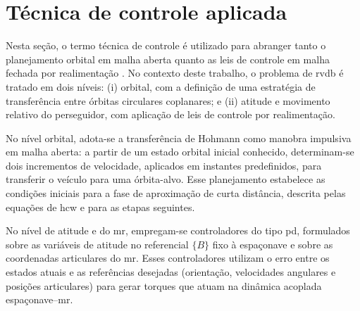 \section{Técnica de controle aplicada}
\label{sec:tecnica_pd}

Nesta seção, o termo técnica de controle é utilizado para abranger tanto o planejamento orbital em malha aberta quanto as leis de controle em malha fechada por realimentação \cite{astrom1995pid}.
No contexto deste trabalho, o problema de \gls{rvdb} é tratado em dois níveis:
(i) orbital, com a definição de uma estratégia de transferência entre órbitas circulares coplanares; e
(ii) atitude e movimento relativo do perseguidor, com aplicação de leis de controle por realimentação.

No nível orbital, adota-se a transferência de Hohmann como manobra impulsiva em malha aberta: a partir de um estado orbital inicial conhecido, determinam-se dois incrementos de velocidade, aplicados em instantes predefinidos, para transferir o veículo para uma órbita-alvo.
Esse planejamento estabelece as condições iniciais para a fase de aproximação de curta distância, descrita pelas equações de \gls{hcw} e para as etapas seguintes.

No nível de atitude e do \gls{mr}, empregam-se controladores do tipo \gls{pd}, formulados sobre as variáveis de atitude no referencial $\{B\}$ fixo à espaçonave e sobre as coordenadas articulares do \gls{mr}.
Esses controladores utilizam o erro entre os estados atuais e as referências desejadas (orientação, velocidades angulares e posições articulares) para gerar torques que atuam na dinâmica acoplada espaçonave--\gls{mr}.















